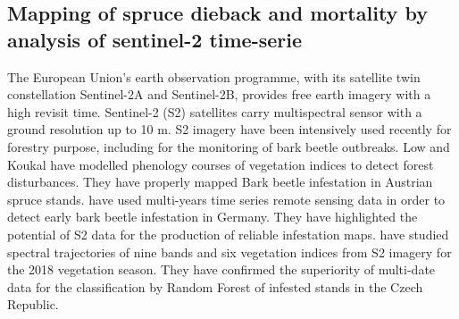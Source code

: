\documentclass[3p,procedia]{elsarticle}
\begin{document}

\subsection{Mapping of spruce dieback and mortality by analysis of sentinel-2 time-serie}


The European Union’s earth observation programme, with its satellite twin constellation Sentinel-2A and Sentinel-2B, provides free earth imagery with a high revisit time. 
Sentinel-2 (S2) satellites carry multispectral sensor with a ground resolution up to 10 m. 
S2 imagery have been intensively used recently for forestry purpose, including for the monitoring of bark beetle outbreaks. 
Low and Koukal \citep{low_phenology_2020} have modelled phenology courses of vegetation indices to detect forest disturbances. 
They have properly mapped Bark beetle infestation in Austrian spruce stands.
\cite{ali_canopy_2021} have used multi-years time series remote sensing data in order to detect early bark beetle infestation in Germany. 
They have highlighted the potential of S2 data for the production of reliable infestation maps.
\cite{barta_early_2021} have studied spectral trajectories of nine bands and six vegetation indices from S2 imagery for the 2018 vegetation season. 
They have confirmed the superiority of multi-date data for the classification by Random Forest of infested stands in the Czech Republic.
\end{document}
